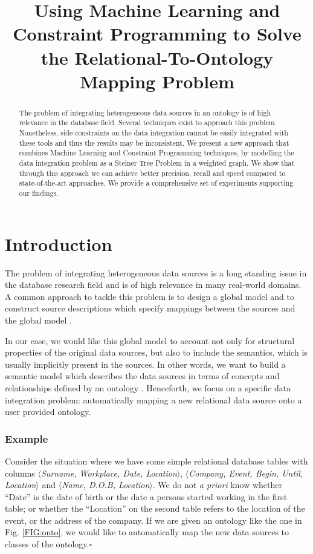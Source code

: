 \documentclass[letterpaper]{article} %
\begin{document}
%
\title{Using Machine Learning and Constraint Programming to Solve the 
Relational-To-Ontology Mapping Problem}
\author{}
\maketitle
\begin{abstract}
The problem of integrating heterogeneous data sources in an ontology is of high 
relevance in the database field. Several techniques exist to approach this 
problem. Nonetheless, side constraints on the data integration cannot be easily 
integrated with these tools and thus the results may be inconsistent. We 
present a new approach that combines Machine Learning and 
Constraint Programming techniques, by modelling the data integration problem as 
a Steiner Tree Problem in a weighted graph. We show that through this approach 
we can achieve better precision, recall and speed compared to state-of-the-art 
approaches. We provide a comprehensive set of experiments supporting our 
findings.
\end{abstract}

\section{Introduction}
The problem of integrating heterogeneous data sources is a long standing issue 
in the database research field and is of high relevance in many real-world 
domains.
A common approach to tackle this problem is to design a global model and to
construct source descriptions which specify mappings between the sources and
the global model \cite{doan2012principles}.

In our case, we would like this global model to account
not only for structural properties of the original data sources, but also to 
include the semantics, which is usually implicitly present in the sources. In 
other words, we want to build a semantic model which describes the data sources 
in terms of concepts and relationships defined by an ontology 
\cite{Taheriyan2013}. Henceforth, we 
focus on a specific data integration problem: automatically mapping a new 
relational data source onto a user provided ontology.

\subsubsection{Example} Consider the situation where we have some simple 
relational database tables with columns $\langle$\textit{Surname, 
Workplace, Date, Location}$\rangle$, 
$\langle$\textit{Company, Event, Begin, Until, Location}$\rangle$ and 
$\langle$\textit{Name, D.O.B, Location}$\rangle$. We do not \textit{a priori} 
know whether ``Date'' is the date of birth or the date a persons started 
working in the first table; or whether the ``Location'' on the second table 
refers to the location of the event, or the address of the company. 
If we are given an ontology like the one in Fig. \ref{FIG:onto}, we would like 
to automatically map the new data sources to classes of the 
ontology.$\square$
\end{document}
